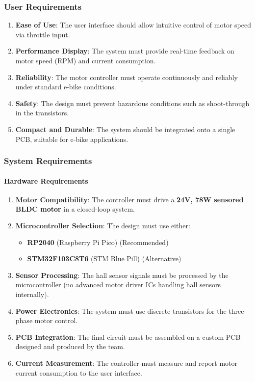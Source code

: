 \subsubsection{User Requirements}
\begin{enumerate}[label=U\arabic*.]
    \item \textbf{Ease of Use}: The user interface should allow intuitive control of motor speed via throttle input.
    \item \textbf{Performance Display}: The system must provide real-time feedback on motor speed (RPM) and current consumption.
    \item \textbf{Reliability}: The motor controller must operate continuously and reliably under standard e-bike conditions.
    \item \textbf{Safety}: The design must prevent hazardous conditions such as shoot-through in the transistors.
    \item \textbf{Compact and Durable}: The system should be integrated onto a single PCB, suitable for e-bike applications.
\end{enumerate}

\subsubsection{System Requirements}

\paragraph{Hardware Requirements}
\begin{enumerate}[label=H\arabic*.]
    \item \textbf{Motor Compatibility}: The controller must drive a \textbf{24V, 78W sensored BLDC motor} in a closed-loop system.
    \item \textbf{Microcontroller Selection}: The design must use either:
    \begin{itemize}
        \item \textbf{RP2040} (Raspberry Pi Pico) (Recommended)
        \item \textbf{STM32F103C8T6} (STM Blue Pill) (Alternative)
    \end{itemize}
    \item \textbf{Sensor Processing}: The hall sensor signals must be processed by the microcontroller (no advanced motor driver ICs handling hall sensors internally).
    \item \textbf{Power Electronics}: The system must use discrete transistors for the three-phase motor control.
    \item \textbf{PCB Integration}: The final circuit must be assembled on a custom PCB designed and produced by the team.
    \item \textbf{Current Measurement}: The controller must measure and report motor current consumption to the user interface.
\end{enumerate}

